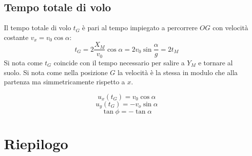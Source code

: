 \documentclass[class=book, crop=false, oneside, 12pt]{standalone}
\begin{document}
	\subsection{Tempo totale di volo}
	Il tempo totale di volo $t_G$ \`e pari al tempo impiegato a percorrere $OG$ con velocit\`a costante $v_x=v_0\cos\alpha$:
	$$t_G=2\dfrac{X_M}{v_0}\cos\alpha=2v_0\sin\dfrac{\alpha}{g}=2t_M$$
	Si nota come $t_G$ coincide con il tempo necessario per salire a $Y_M$ e tornare al suolo.
	Si nota come nella posizione $G$ la velocit\`a \`e la stessa in modulo che alla partenza ma simmetricamente rispetto a $x$.
  \begin{multicols}{3}
    \noindent
    $$u_x(t_G)=v_0\cos\alpha$$
    $$u_y(t_G)=-v_o\sin\alpha$$
    $$\tan\phi=-\tan\alpha$$
  \end{multicols}
\section{Riepilogo}
\end{document}

